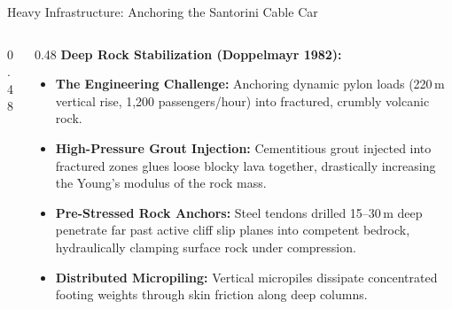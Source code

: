 \begin{frame}{Heavy Infrastructure: Anchoring the Santorini Cable Car}
  \begin{columns}[T, onlytextwidth]
    \begin{column}{0.48\textwidth}
    \end{column}
    
    \begin{column}{0.48\textwidth}
      \textbf{\color{aegeanblue}Deep Rock Stabilization (Doppelmayr 1982):}
      \vspace{0.2em}
      \begin{itemize}
        \setlength{\itemsep}{0.3em}
        \item \textbf{The Engineering Challenge:} Anchoring dynamic pylon loads (220\,m vertical rise, 1,200 passengers/hour) into fractured, crumbly volcanic rock.
        \item \textbf{High-Pressure Grout Injection:} Cementitious grout injected into fractured zones glues loose blocky lava together, drastically increasing the Young's modulus of the rock mass.
        \item \textbf{Pre-Stressed Rock Anchors:} Steel tendons drilled 15--30\,m deep penetrate far past active cliff slip planes into competent bedrock, hydraulically clamping surface rock under compression.
        \item \textbf{Distributed Micropiling:} Vertical micropiles dissipate concentrated footing weights through skin friction along deep columns.
      \end{itemize}
    \end{column}
  \end{columns}
\end{frame}
